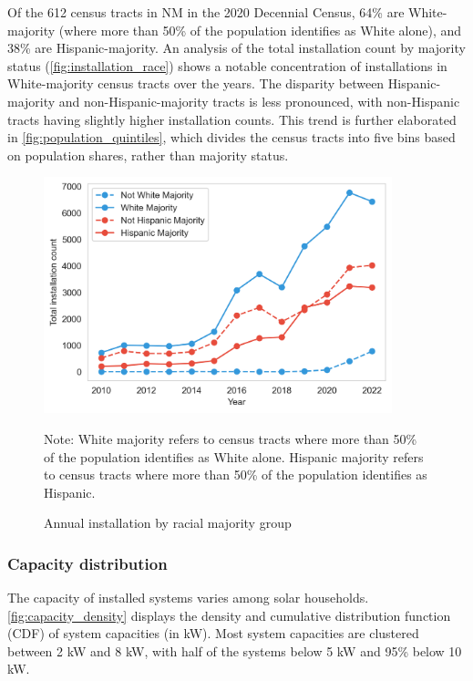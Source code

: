 \documentclass[11pt,twoside,letterpaper]{article}
\begin{document}
Of the 612 census tracts in NM in the 2020 Decennial Census, 64\% are White-majority (where more than 50\% of the population identifies as White alone), and 38\% are Hispanic-majority. An analysis of the total installation count by majority status (\autoref{fig:installation_race}) shows a notable concentration of installations in White-majority census tracts over the years. The disparity between Hispanic-majority and non-Hispanic-majority tracts is less pronounced, with non-Hispanic tracts having slightly higher installation counts. This trend is further elaborated in \autoref{fig:population_quintiles}, which divides the census tracts into five bins based on population shares, rather than majority status.

\begin{figure}[!ht]
    \centering
\includegraphics[width=0.9\textwidth]{figures/installation_by_race.png}
    \caption{Annual installation by racial majority group}
    \label{fig:installation_race}
        \begin{flushleft}
        \footnotesize Note: White majority refers to census tracts where more than 50\% of the population identifies as White alone. Hispanic majority refers to census tracts where more than 50\% of the population identifies as Hispanic.
    \end{flushleft}
\end{figure}



\subsubsection{Capacity distribution}

The capacity of installed systems varies among solar households. \autoref{fig:capacity_density} displays the density and cumulative distribution function (CDF) of system capacities (in kW). Most system capacities are clustered between 2 kW and 8 kW, with half of the systems below 5 kW and 95\% below 10 kW.
\end{document}
